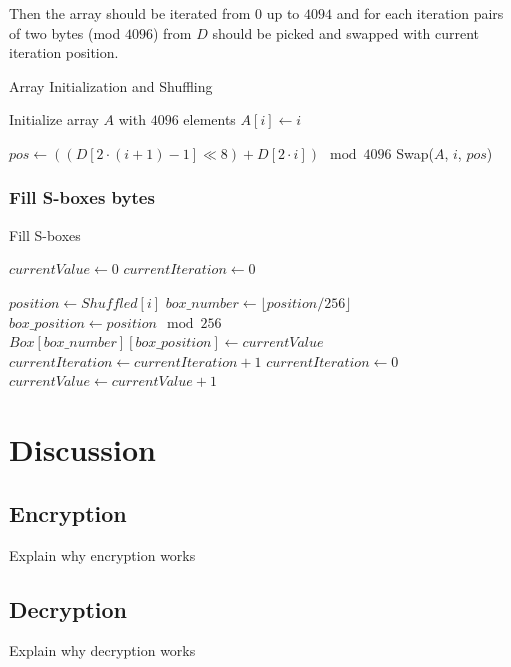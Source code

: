 \documentclass{article} %
\begin{document}
Then the array should be iterated from $0$ up to $4094$ and for each iteration pairs of two bytes (mod $4096$) from $D$ should be picked and swapped with current iteration position.

\begin{algorithm}[H]
  \caption{Array Initialization and Shuffling}
  \begin{algorithmic}[1]
  \State Initialize array $A$ with $4096$ elements
      \State $A[i] \gets i$
  \EndFor
  
      \State $pos \gets ((D[2 \cdot (i+1) - 1] \ll 8) + D[2 \cdot i]) \mod 4096$
      \State Swap($A$, $i$, $pos$)
  \EndFor
  \end{algorithmic}
\end{algorithm}


\subsubsection{Fill S-boxes bytes}

\begin{algorithm}[H]
  \caption{Fill S-boxes}
  \begin{algorithmic}[1]

    \State $currentValue \gets 0$
    \State $currentIteration \gets 0$

      \State $position \gets Shuffled[i]$
      \State $box\_number \gets \lfloor position / 256 \rfloor$
      \State $box\_position \gets position \mod 256$
      \State $Box[box\_number][box\_position] \gets currentValue$
      \State $currentIteration \gets currentIteration + 1$
          \State $currentIteration \gets 0$
          \State $currentValue \gets currentValue + 1$
      \EndIf
    \EndFor

  \end{algorithmic}
\end{algorithm} 

\section {Discussion}

\subsection{Encryption}
Explain why encryption works

\subsection{Decryption}
Explain why decryption works
\end{document}
